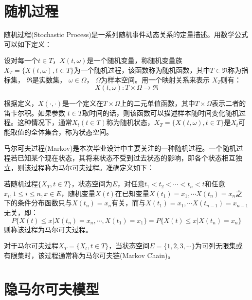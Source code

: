 \section{随机过程}

随机过程(Stochastic Process)是一系列随机事件动态关系的定量描述。用数学公式可以如下定义：

\begin{defn}
	设对每一个$t \in T$，$X(t,\omega)$是一个随机变量，称随机变量族 $X_T = \{X(t,\omega), t \in T\}$为一个随机过程，该函数称为随机函数，其中$T \in \Re$称为指标集， $\Re$是实数集， $\omega \in \Omega$， $\Omega$为样本空间。用一个映射关系来表示 $X_T$则有：
	\begin{equation}
		X(t,\omega):T \times \Omega \rightarrow \Re
	\end{equation}
\end{defn}

根据定义，$X(\cdot , \cdot)$是一个定义在$T \times \Omega$上的二元单值函数，其中$T \times \Omega$表示二者的笛卡尔积。如果参数 $t \in T$取时间的话，则该函数可以描述样本随时间变化随机过程。这种情况下，通常$X_t (t \in T)$称为随机状态，$X_T = \{X(t,\omega), t \in T\}$是$X_t$可能取值的全体集合，称为状态空间。

马尔可夫过程(Markov)是本次毕业设计中主要关注的一种随机过程。一个随机过程若已知某个现在状态，其将来状态不受到过去状态的影响，即各个状态相互独立，则该过程称为马尔可夫过程。准确定义如下：

\begin{defn}
	若随机过程$\{X_T, t \in T\}$，状态空间为$E$，对任意$t_1 < t_2 < \cdots < t_n < t$和任意$x_i, 1 \leq i \leq n, x \in E$，随机变量$X(t)$在已知变量$X(t_1) = x_1, \cdots X(t_n) = x_n$之下的条件分布函数只与$X(t_n) = x_n$有关，而与$X(t_1) = x_1, \cdots X(t_{n-1}) = x_{n-1}$无关，即：
	\begin{equation}
		P\{X(t) \leq x | X(t_n) = x_n, \cdots , X(t_1) = x_1\} = P\{X(t) \leq x | X(t_n) = x_n\}
	\end{equation}
	则称该过程为马尔可夫过程。
\end{defn}

对于马尔可夫过程$X_T = \{X_t, t \in T \}$，当状态空间$E = \{1,2,3,\cdots\}$为可列无限集或有限集时，该过程通常称为马尔可夫链(Markov Chain)。




\section{隐马尔可夫模型}

